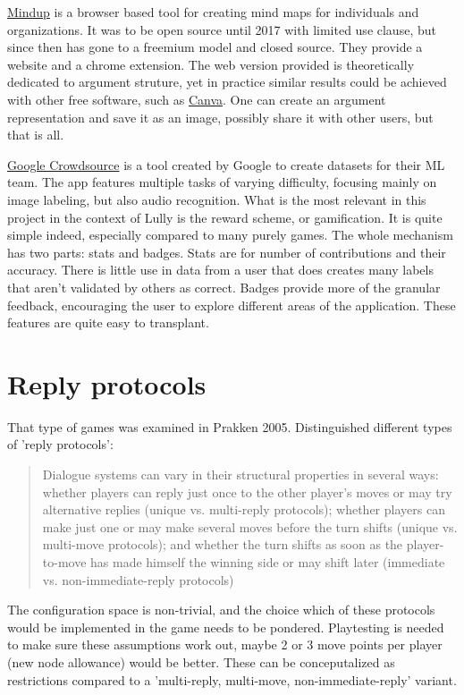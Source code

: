 \documentclass{report}
\begin{document}
\href{https://www.mindmup.com/}{Mindup} is a browser based tool for creating mind maps for individuals and organizations. It was to be open source until 2017 with limited use clause, but since then has gone to a freemium model and closed source. They provide a website and a chrome extension. The web version provided is theoretically dedicated to argument struture, yet in practice similar results could be achieved with other free software, such as \href{https://www.canva.com/}{Canva}. One can create an argument representation and save it as an image, possibly share it with other users, but that is all.

\href{https://en.wikipedia.org/wiki/Crowdsource_(app)}{Google Crowdsource} is a tool created by Google to create datasets for their ML team. The app features multiple tasks of varying difficulty, focusing mainly on image labeling, but also audio recognition. What is the most relevant in this project in the context of Lully is the reward scheme, or gamification. It is quite simple indeed, especially compared to many purely games. The whole mechanism has two parts: stats and badges. Stats are for number of contributions and their accuracy. There is little use in data from a user that does creates many labels that aren't validated by others as correct. Badges provide more of the granular feedback, encouraging the user to explore different areas of the application. These features are quite easy to transplant.

\section{Reply protocols}
That type of games was examined in Prakken 2005. Distinguished different types of 'reply protocols':
\begin{quotation}
  Dialogue systems can vary in their structural properties
in several ways: whether players can reply just once to the other player’s moves or may try
alternative replies (unique vs. multi-reply protocols); whether players can make just one or may
make several moves before the turn shifts (unique vs. multi-move protocols); and whether the turn
shifts as soon as the player-to-move has made himself the winning side or may shift later (immediate
vs. non-immediate-reply protocols)
\end{quotation}
\cite[page 1010]{Prakken2005}

The configuration space is non-trivial, and the choice which of these protocols would be implemented in the game needs to be pondered.
Playtesting is needed to make sure these assumptions work out, maybe 2 or 3 move points per player (new node allowance) would be better.
These can be conceputalized as restrictions compared to a 'multi-reply, multi-move, non-immediate-reply' variant.
\end{document}
